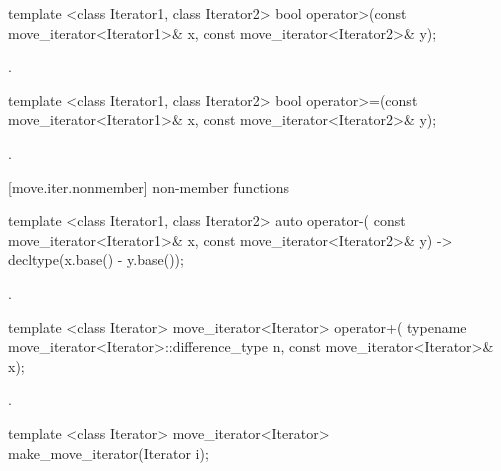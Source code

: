 %
%
\begin{itemdecl}
template <class Iterator1, class Iterator2>
bool operator>(const move_iterator<Iterator1>& x, const move_iterator<Iterator2>& y);
\end{itemdecl}

\begin{itemdescr}
\pnum
\returns {}.
\end{itemdescr}

%
%
\begin{itemdecl}
template <class Iterator1, class Iterator2>
bool operator>=(const move_iterator<Iterator1>& x, const move_iterator<Iterator2>& y);
\end{itemdecl}

\begin{itemdescr}
\pnum
\returns {}.
\end{itemdescr}

[move.iter.nonmember]{ non-member functions}

%
%
\begin{itemdecl}
template <class Iterator1, class Iterator2>
    auto operator-(
    const move_iterator<Iterator1>& x,
    const move_iterator<Iterator2>& y) -> decltype(x.base() - y.base());
\end{itemdecl}

\begin{itemdescr}
\pnum
\returns {}.
\end{itemdescr}

%
%
\begin{itemdecl}
template <class Iterator>
  move_iterator<Iterator> operator+(
    typename move_iterator<Iterator>::difference_type n, const move_iterator<Iterator>& x);
\end{itemdecl}

\begin{itemdescr}
\pnum
\returns {}.
\end{itemdescr}

%
\begin{itemdecl}
template <class Iterator>
move_iterator<Iterator> make_move_iterator(Iterator i);
\end{itemdecl}

